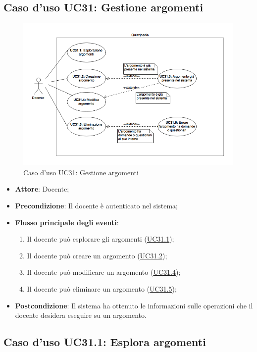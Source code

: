 \documentclass[12pt,a4paper]{article}
\begin{document}
\subsection{Caso d'uso UC31: Gestione argomenti}
\begin{figure}[H]
	\centering
	\includegraphics[width=\textwidth]{../img/diagramUC31.png}
	\caption{Caso d'uso UC31: Gestione argomenti}\label{fig:UC31} 
\end{figure}
\begin{itemize}

\item \textbf{Attore}: Docente; 
\item \textbf{Precondizione}: Il docente è autenticato nel sistema;

\item \textbf{Flusso principale degli eventi}:
\begin{enumerate}
	\item Il docente può esplorare gli argomenti (\hyperlink{UC31.1}{UC31.1});
	\item Il docente può creare un argomento (\hyperlink{UC31.2}{UC31.2});
	\item Il docente può modificare un argomento (\hyperlink{UC31.4}{UC31.4});
	\item Il docente può eliminare un argomento (\hyperlink{UC31.5}{UC31.5});
	
\end{enumerate}
\item \textbf{Postcondizione}: Il sistema ha ottenuto le informazioni sulle operazioni che il docente desidera eseguire su un argomento.
\end{itemize}
\hypertarget{UC31.1}{}
\subsection{Caso d'uso UC31.1: Esplora argomenti}
\end{document}

